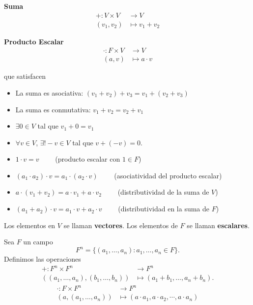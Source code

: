 \documentclass[12pt,a4paper]{book}
\begin{document}
    \textbf{Suma}
    \begin{align*}
        +:V\times V&\to V\\
        (v_{1},v_{2})&\mapsto v_{1}+v_{2}
    \end{align*}

    \textbf{Producto Escalar}
    \begin{align*}
        \cdot: F\times V&\to V\\
        (a,v)&\mapsto a\cdot v
    \end{align*}

    que satisfacen
    \begin{itemize}
        \item La suma es asociativa: $(v_{1}+v_{2})+v_{3}=v_{1}+(v_{2}+v_{3})$
        \item La suma es conmutativa: $v_{1}+v_{2}=v_{2}+v_{1}$
        \item $\exists0\in V$ tal que $v_{1}+0=v_{1}$
        \item $\forall v\in V$, $\exists! -v\in V$ tal que $v+(-v)=0$.
        \item $1\cdot v=v\qquad$ (producto escalar con $1\in F$)
        \item $(a_{1}\cdot a_{2})\cdot v=a_{1}\cdot(a_{2}\cdot v)\qquad$ (asociatividad del producto escalar)
        \item $a\cdot(v_{1}+v_{2})=a\cdot v_{1}+a\cdot v_{2}\qquad$ (distributividad de la suma de $V$)
        \item $(a_{1}+a_{2})\cdot v=a_{1}\cdot v+a_{2}\cdot v\qquad$ (distributividad en la suma de $F$)  
    \end{itemize}

    \begin{definicion}
    \label{def:11}
        Los elementos en $V$ se llaman \textbf{vectores}.
        Los elementos de $F$ se llaman \textbf{escalares}.
    \end{definicion}

    \begin{ejemplo}
    \label{ej:14}
        Sea $F$ un campo
        \begin{equation*}
            F^{n}=\{(a_{1},\dots,a_{n}):a_{1},\dots,a_{n}\in F\}.
        \end{equation*}
        Definimos las operaciones
        \begin{align*}
            +:F^{n}\times F^{n}&\to F^{n}\\
            ((a_{1},\dots,a_{n}),(b_{1},\dots,b_{n}))&\mapsto (a_{1}+b_{1},\dots,a_{n}+b_{n}).
        \end{align*}
        \begin{align*}
            \cdot:F\times F^{n}&\to F^{n}\\
            (a,(a_{1},\dots,a_{n}))&\mapsto (a\cdot a_{1},a\cdot a_{2},\cdots,a\cdot a_{n})
        \end{align*}
    \end{ejemplo}
\end{document}
